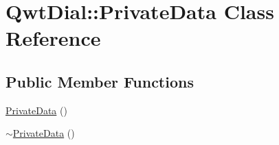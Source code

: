 \hypertarget{class_qwt_dial_1_1_private_data}{\section{Qwt\-Dial\-:\-:Private\-Data Class Reference}
\label{class_qwt_dial_1_1_private_data}
}
\subsection*{Public Member Functions}
\begin{DoxyCompactItemize}
\item 
\hyperlink{class_qwt_dial_1_1_private_data_a3d5836f968ba53ac7b425a51ca3d5673}{Private\-Data} ()
\item 
\hyperlink{class_qwt_dial_1_1_private_data_a1608b9043eaf011bf8e3c3e27ca9b878}{$\sim$\-Private\-Data} ()
\end{DoxyCompactItemize}

